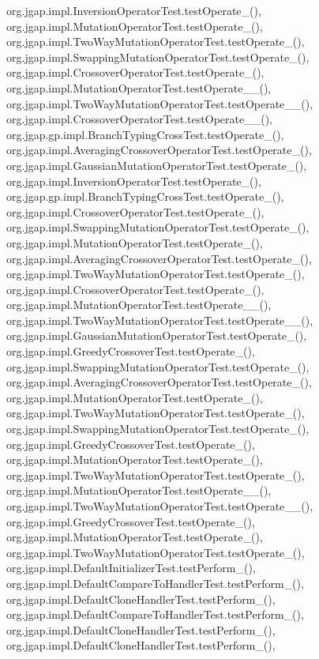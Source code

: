 org.\-jgap.\-impl.\-Inversion\-Operator\-Test.\-test\-Operate\-\_(), org.\-jgap.\-impl.\-Mutation\-Operator\-Test.\-test\-Operate\-\_(), org.\-jgap.\-impl.\-Two\-Way\-Mutation\-Operator\-Test.\-test\-Operate\-\_(), org.\-jgap.\-impl.\-Swapping\-Mutation\-Operator\-Test.\-test\-Operate\-\_(), org.\-jgap.\-impl.\-Crossover\-Operator\-Test.\-test\-Operate\-\_(), org.\-jgap.\-impl.\-Mutation\-Operator\-Test.\-test\-Operate\-\_\-\_(), org.\-jgap.\-impl.\-Two\-Way\-Mutation\-Operator\-Test.\-test\-Operate\-\_\-\_(), org.\-jgap.\-impl.\-Crossover\-Operator\-Test.\-test\-Operate\-\_\-\_(), org.\-jgap.\-gp.\-impl.\-Branch\-Typing\-Cross\-Test.\-test\-Operate\-\_(), org.\-jgap.\-impl.\-Averaging\-Crossover\-Operator\-Test.\-test\-Operate\-\_(), org.\-jgap.\-impl.\-Gaussian\-Mutation\-Operator\-Test.\-test\-Operate\-\_(), org.\-jgap.\-impl.\-Inversion\-Operator\-Test.\-test\-Operate\-\_(), org.\-jgap.\-gp.\-impl.\-Branch\-Typing\-Cross\-Test.\-test\-Operate\-\_(), org.\-jgap.\-impl.\-Crossover\-Operator\-Test.\-test\-Operate\-\_(), org.\-jgap.\-impl.\-Swapping\-Mutation\-Operator\-Test.\-test\-Operate\-\_(), org.\-jgap.\-impl.\-Mutation\-Operator\-Test.\-test\-Operate\-\_(), org.\-jgap.\-impl.\-Averaging\-Crossover\-Operator\-Test.\-test\-Operate\-\_(), org.\-jgap.\-impl.\-Two\-Way\-Mutation\-Operator\-Test.\-test\-Operate\-\_(), org.\-jgap.\-impl.\-Crossover\-Operator\-Test.\-test\-Operate\-\_(), org.\-jgap.\-impl.\-Mutation\-Operator\-Test.\-test\-Operate\-\_\-\_(), org.\-jgap.\-impl.\-Two\-Way\-Mutation\-Operator\-Test.\-test\-Operate\-\_\-\_(), org.\-jgap.\-impl.\-Gaussian\-Mutation\-Operator\-Test.\-test\-Operate\-\_(), org.\-jgap.\-impl.\-Greedy\-Crossover\-Test.\-test\-Operate\-\_(), org.\-jgap.\-impl.\-Swapping\-Mutation\-Operator\-Test.\-test\-Operate\-\_(), org.\-jgap.\-impl.\-Averaging\-Crossover\-Operator\-Test.\-test\-Operate\-\_(), org.\-jgap.\-impl.\-Mutation\-Operator\-Test.\-test\-Operate\-\_(), org.\-jgap.\-impl.\-Two\-Way\-Mutation\-Operator\-Test.\-test\-Operate\-\_(), org.\-jgap.\-impl.\-Swapping\-Mutation\-Operator\-Test.\-test\-Operate\-\_(), org.\-jgap.\-impl.\-Greedy\-Crossover\-Test.\-test\-Operate\-\_(), org.\-jgap.\-impl.\-Mutation\-Operator\-Test.\-test\-Operate\-\_(), org.\-jgap.\-impl.\-Two\-Way\-Mutation\-Operator\-Test.\-test\-Operate\-\_(), org.\-jgap.\-impl.\-Mutation\-Operator\-Test.\-test\-Operate\-\_\-\_(), org.\-jgap.\-impl.\-Two\-Way\-Mutation\-Operator\-Test.\-test\-Operate\-\_\-\_(), org.\-jgap.\-impl.\-Greedy\-Crossover\-Test.\-test\-Operate\-\_(), org.\-jgap.\-impl.\-Mutation\-Operator\-Test.\-test\-Operate\-\_(), org.\-jgap.\-impl.\-Two\-Way\-Mutation\-Operator\-Test.\-test\-Operate\-\_(), org.\-jgap.\-impl.\-Default\-Initializer\-Test.\-test\-Perform\-\_(), org.\-jgap.\-impl.\-Default\-Compare\-To\-Handler\-Test.\-test\-Perform\-\_(), org.\-jgap.\-impl.\-Default\-Clone\-Handler\-Test.\-test\-Perform\-\_(), org.\-jgap.\-impl.\-Default\-Compare\-To\-Handler\-Test.\-test\-Perform\-\_(), org.\-jgap.\-impl.\-Default\-Clone\-Handler\-Test.\-test\-Perform\-\_(), org.\-jgap.\-impl.\-Default\-Clone\-Handler\-Test.\-test\-Perform\-\_(), 